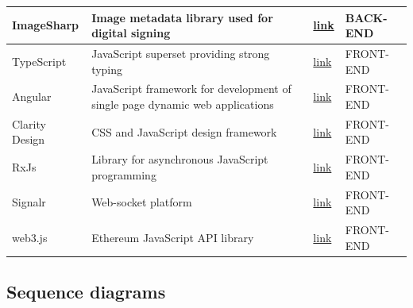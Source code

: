 \begin{table}[H]
\begin{tabular}{|p{}|p{}|p{}|p{}|}
ImageSharp     & Image metadata library used for digital signing                                       & \href{https://github.com/SixLabors/ImageSharp}{link}           & BACK-END  \\ \hline
TypeScript     & JavaScript superset providing strong typing                                           & \href{https://www.typescriptlang.org/}{link}                   & FRONT-END \\ \hline
Angular        & JavaScript framework for development of single page dynamic web applications          & \href{https://angular.io/}{link}                               & FRONT-END \\ \hline
Clarity Design & CSS and JavaScript design framework                                                   & \href{https://clarity.design/}{link}                           & FRONT-END \\ \hline
RxJs           & Library for asynchronous JavaScript programming                                       & \href{https://rxjs.dev/}{link}                                 & FRONT-END \\ \hline
Signalr        & Web-socket platform                                                                   & \href{https://www.npmjs.com/package/@microsoft/signalr}{link}  & FRONT-END \\ \hline
web3.js        & Ethereum JavaScript API library                                                       & \href{https://www.npmjs.com/package/web3}{link}                & FRONT-END \\ \hline
\end{tabular}
\end{table}

\subsection{Sequence diagrams}


